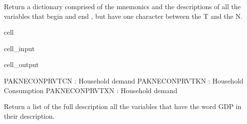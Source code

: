\documentclass[letterpaper,10pt,english]{jupyterBook}
\begin{document}
\sphinxAtStartPar
Return a dictionary comprised of the mnemonics and the descriptions of all the variables that begin  and end , but have one character between the T and the N.

\begin{sphinxuseclass}{cell}\begin{sphinxVerbatimInput}

\begin{sphinxuseclass}{cell_input}
\begin{sphinxVerbatim}[commandchars=\\\{\}]
\PYG{p}{[}\PYG{p}{]}
\end{sphinxVerbatim}

\end{sphinxuseclass}\end{sphinxVerbatimInput}
\begin{sphinxVerbatimOutput}

\begin{sphinxuseclass}{cell_output}
\begin{sphinxVerbatim}[commandchars=\\\{\}]
PAKNECONPRVTCN : Household demand
PAKNECONPRVTKN : Household Consumption
PAKNECONPRVTXN : Household demand
\end{sphinxVerbatim}

\end{sphinxuseclass}\end{sphinxVerbatimOutput}

\end{sphinxuseclass}
\sphinxAtStartPar
Return a list of the full description  all the variables that have the word GDP in their description.
\end{document}
